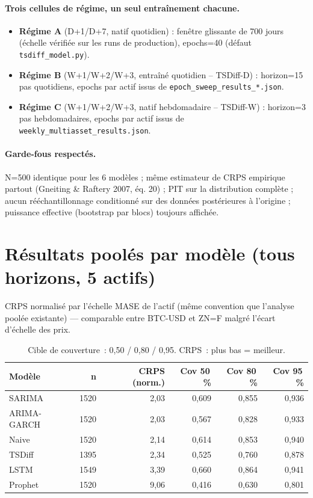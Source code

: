 \documentclass[11pt]{article}
\begin{document}
\paragraph{Trois cellules de r\'egime, un seul entra\^inement chacune.}
\begin{itemize}
  \item \textbf{R\'egime A} (D+1/D+7, natif quotidien) : fen\^etre glissante
        de 700 jours (\'echelle v\'erifi\'ee sur les runs de production),
        epochs=40 (d\'efaut \texttt{tsdiff\_model.py}).
  \item \textbf{R\'egime B} (W+1/W+2/W+3, entra\^in\'e quotidien --
        \guillemotleft{}TSDiff-D\guillemotright{}) : horizon=15 pas
        quotidiens, epochs par actif issus de
        \texttt{epoch\_sweep\_results\_*.json}.
  \item \textbf{R\'egime C} (W+1/W+2/W+3, natif hebdomadaire --
        \guillemotleft{}TSDiff-W\guillemotright{}) : horizon=3 pas
        hebdomadaires, epochs par actif issus de
        \texttt{weekly\_multiasset\_results.json}.
\end{itemize}

\paragraph{Garde-fous respect\'es.} N=500 identique pour les 6 mod\`eles ;
m\^eme estimateur de CRPS empirique partout (Gneiting \& Raftery 2007, \'eq.
20) ; PIT sur la distribution compl\`ete ; aucun r\'e\'echantillonnage
conditionn\'e sur des donn\'ees post\'erieures \`a l'origine ; puissance
effective (bootstrap par blocs) toujours affich\'ee.

\section{R\'esultats poolés par mod\`ele (tous horizons, 5 actifs)}

CRPS normalis\'e par l'\'echelle MASE de l'actif (m\^eme convention que
l'analyse pool\'ee existante) --- comparable entre BTC-USD et ZN=F malgr\'e
l'\'ecart d'\'echelle des prix.

\begin{table}[h]
\centering
\begin{tabular}{lrrrrr}
\toprule
Mod\`ele & n & CRPS (norm.) & Cov 50\,\% & Cov 80\,\% & Cov 95\,\% \\
\midrule
SARIMA      & 1520 & 2,03 & 0,609 & 0,855 & 0,936 \\
ARIMA-GARCH & 1520 & 2,03 & 0,567 & 0,828 & 0,933 \\
Naive       & 1520 & 2,14 & 0,614 & 0,853 & 0,940 \\
TSDiff      & 1395 & 2,34 & 0,525 & 0,760 & 0,878 \\
LSTM        & 1549 & 3,39 & 0,660 & 0,864 & 0,941 \\
Prophet     & 1520 & 9,06 & 0,416 & 0,630 & 0,801 \\
\bottomrule
\end{tabular}
\caption{Cible de couverture~: 0,50 / 0,80 / 0,95. CRPS~: plus bas = meilleur.}
\end{table}
\end{document}
